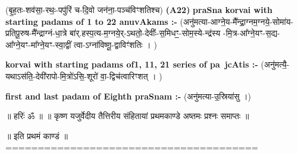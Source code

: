 \documentclass[17pt]{extarticle}
\begin{document}
                  \newline
                      (बृ॒ह॒तः-शव॑सा॒-रथः॒-पपु॑रिं च-दि॒वो जन॑ना॒-पञ्च॑विꣳशतिश्च)  \textbf{(A22)} \newline \newline
\textbf{praSna korvai with starting padams of 1 to 22 anuvAkams :-} \newline
(अनु॑मत्या-आग्ने॒य-मै᳚न्द्रा॒ग्नम॒ग्नये॒-सोमा॑य-प्रतिपू॒रुष-मै᳚न्द्राग्नं-धा॒त्रे बा॑र्.हस्प॒त्य-म॒ग्नये॒र्-ऽथतो॒-देवीः᳚-स॒मिधꣳ॒॒-सोम॒स्ये-न्द्र॑स्य -मि॒त्र-आ᳚ग्ने॒यꣳ-स॒द्य-आ᳚ग्ने॒यꣳ-मा᳚ग्ने॒यꣳ-स्वा॒द्वीं त्वा-ऽग्ना॑विष्णू॒-द्वाविꣳ॑शतिः । ) \newline

\textbf{korvai with starting padams of1, 11, 21 series of pa~jcAtis :-} \newline
(अनु॑मत्यै॒-यथाऽस॑ति॒-देवी॑रापो-मि॒त्रो॑ऽसि॒-शूरो॑ वा॒-द्विच॑त्वारिꣳशत् । ) \newline

\textbf{first and last padam of Eighth praSnam :-} \newline
(अनु॑मत्या-उ॒स्रिया॑सु ।) \newline 


॥ हरिः॑ ॐ ॥
॥ कृष्ण यजुर्वेदीय तैत्तिरीय संहितायां 
प्रथमकाण्डे अष्तमः प्रश्नः समाप्तः ॥

॥ इति प्रथमं काण्डं ॥
======================================= \newline
\pagebreak
\pagebreak
        
\end{document}

